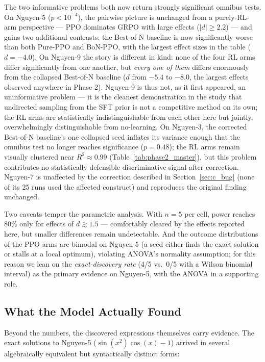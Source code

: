 The two informative problems both now return strongly significant omnibus tests. On Nguyen-5 ($p<10^{-4}$), the pairwise picture is unchanged from a purely-RL-arm perspective --- PPO dominates GRPO with large effects ($|d|\geq2.2$) --- and gains two additional contrasts: the Best-of-N baseline is now significantly worse than both Pure-PPO and BoN-PPO, with the largest effect sizes in the table ($d=-4.0$). On Nguyen-9 the story is different in kind: none of the four RL arms differ significantly from one another, but \emph{every one of them} differs enormously from the collapsed Best-of-N baseline ($d$ from $-5.4$ to $-8.0$, the largest effects observed anywhere in Phase 2). Nguyen-9 is thus not, as it first appeared, an uninformative problem --- it is the cleanest demonstration in the study that undirected sampling from the SFT prior is not a competitive method on its own; the RL arms are statistically indistinguishable from each other here but jointly, overwhelmingly distinguishable from no-learning. On Nguyen-3, the corrected Best-of-N baseline's one collapsed seed inflates its variance enough that the omnibus test no longer reaches significance ($p=0.48$); the RL arms remain visually clustered near $R^2\approx0.99$ (Table~\ref{tab:phase2_master}), but this problem contributes no statistically defensible discriminative signal after correction. Nguyen-7 is unaffected by the correction described in Section~\ref{sec:c_bug} (none of its 25 runs used the affected construct) and reproduces the original finding unchanged.

Two caveats temper the parametric analysis. With $n=5$ per cell, power reaches 80\% only for effects of $d \gtrsim 1.5$ --- comfortably cleared by the effects reported here, but smaller differences remain undetectable. And the outcome distributions of the PPO arms are bimodal on Nguyen-5 (a seed either finds the exact solution or stalls at a local optimum), violating ANOVA's normality assumption; for this reason we lean on the \emph{exact-discovery rate} (4/5 vs.\ 0/5 with a Wilson binomial interval) as the primary evidence on Nguyen-5, with the ANOVA in a supporting role.

\subsection{What the Model Actually Found}

Beyond the numbers, the discovered expressions themselves carry evidence. The exact solutions to Nguyen-5 ($\sin(x^2)\cos(x)-1$) arrived in several algebraically equivalent but syntactically distinct forms:

